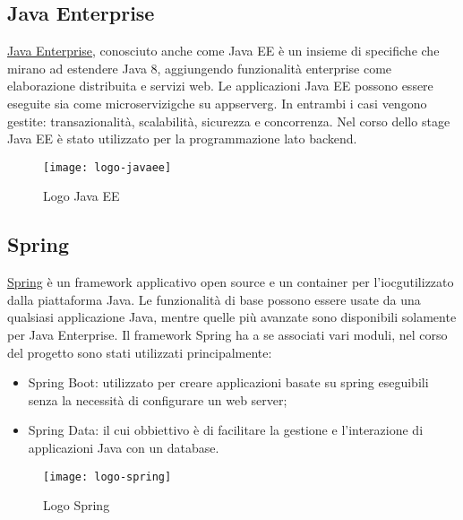 \subsection{Java Enterprise}
\href{https://www.oracle.com/it/java/technologies/java-ee-glance.html}{Java Enterprise}, conosciuto anche come Java EE è un insieme di specifiche che mirano ad estendere Java 8, aggiungendo funzionalità enterprise come elaborazione distribuita e servizi web. Le applicazioni Java EE possono essere eseguite sia come \gls{microservizig}\glsfirstoccur che su \gls{appserverg}\glsfirstoccur. In entrambi i casi vengono gestite: transazionalità, scalabilità, sicurezza e concorrenza.
Nel corso dello stage Java EE è stato utilizzato per la programmazione lato backend.
\begin{figure}[h]
    \begin{center}
    \texttt{[image: logo-javaee]}
    \caption{Logo Java EE}
    \label{fig:figure3}
    \end{center}
\end{figure}

\subsection{Spring}
\href{https://spring.io/}{Spring} è un framework applicativo open source e un container per l'\gls{iocg}\glsfirstoccur utilizzato dalla piattaforma Java. Le funzionalità di base possono essere usate da una qualsiasi applicazione Java, mentre quelle più avanzate sono disponibili solamente per Java Enterprise.
Il framework Spring ha a se associati vari moduli, nel corso del progetto sono stati utilizzati principalmente:
\begin{itemize}
    \item Spring Boot: utilizzato per creare applicazioni basate su spring eseguibili senza la necessità di configurare un web server;
    \item Spring Data: il cui obbiettivo è di facilitare la gestione e l'interazione di applicazioni Java con un database.
\end{itemize}
\begin{figure}[h]
    \begin{center}
    \texttt{[image: logo-spring]}
    \caption{Logo Spring}
    \label{fig:figure4}
    \end{center}
\end{figure}

